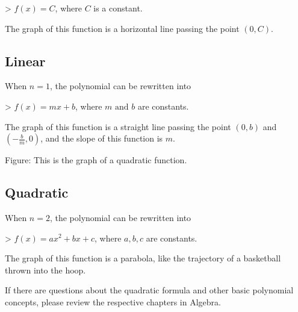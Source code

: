 > $f(x)=C$, where $C$ is a constant.



The graph of this function is a horizontal line passing the point $(0,C)$.




\subsection{Linear}
\label{sss:line-9a93}




When $n=1$, the polynomial can be rewritten into



> $f(x)=mx+b$, where $m\text{ and }b$ are constants.



The graph of this function is a straight line passing the point $(0,b)$ and
$(-\frac{b}{m},0)$, and the slope of this function is $m$.






Figure: This is the graph of a quadratic function.




\subsection{Quadratic}
\label{sss:quad-d2ac}




When $n=2$, the polynomial can be rewritten into



> $f(x)=ax^2+bx+c$, where $a,b,c$ are constants.



The graph of this function is a parabola, like the trajectory of a basketball thrown into the hoop.



If there are questions about the quadratic formula and other basic polynomial concepts,
please review the respective chapters in Algebra.




